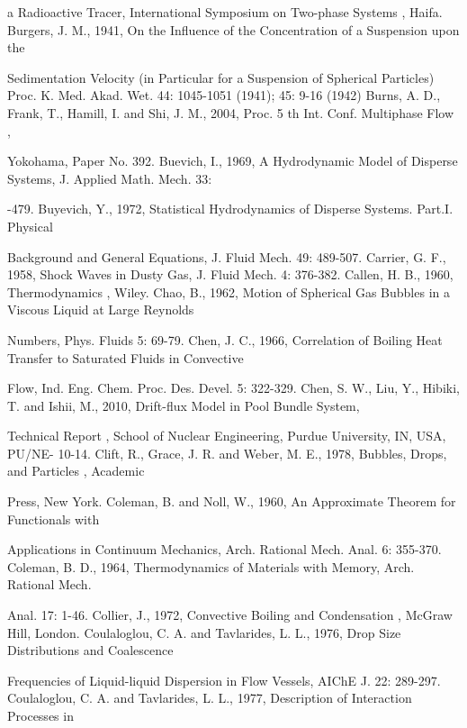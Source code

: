 \documentclass[11pt,a4paper,openany,fontset=none]{ctexbook}
\begin{document}
{\small\raggedright\noindent a Radioactive Tracer, International Symposium on Two-phase Systems , Haifa. Burgers, J. M., 1941, On the Influence of the Concentration of a Suspension upon the\par}
{\small\raggedright\noindent Sedimentation Velocity (in Particular for a Suspension of Spherical Particles) Proc. K. Med. Akad. Wet. 44: 1045-1051 (1941); 45: 9-16 (1942) Burns, A. D., Frank, T., Hamill, I. and Shi, J. M., 2004, Proc. 5 th Int. Conf. Multiphase Flow ,\par}
{\small\raggedright\noindent Yokohama, Paper No. 392. Buevich, I., 1969, A Hydrodynamic Model of Disperse Systems, J. Applied Math. Mech. 33:\par}
{\small\raggedright{}-479. Buyevich, Y., 1972, Statistical Hydrodynamics of Disperse Systems. Part.I. Physical\par}
{\small\raggedright\noindent Background and General Equations, J. Fluid Mech. 49: 489-507. Carrier, G. F., 1958, Shock Waves in Dusty Gas, J. Fluid Mech. 4: 376-382. Callen, H. B., 1960, Thermodynamics , Wiley. Chao, B., 1962, Motion of Spherical Gas Bubbles in a Viscous Liquid at Large Reynolds\par}
{\small\raggedright\noindent Numbers, Phys. Fluids 5: 69-79. Chen, J. C., 1966, Correlation of Boiling Heat Transfer to Saturated Fluids in Convective\par}
{\small\raggedright\noindent Flow, Ind. Eng. Chem. Proc. Des. Devel. 5: 322-329. Chen, S. W., Liu, Y., Hibiki, T. and Ishii, M., 2010, Drift-flux Model in Pool Bundle System,\par}
{\small\raggedright\noindent Technical Report , School of Nuclear Engineering, Purdue University, IN, USA, PU/NE- 10-14. Clift, R., Grace, J. R. and Weber, M. E., 1978, Bubbles, Drops, and Particles , Academic\par}
{\small\raggedright\noindent Press, New York. Coleman, B. and Noll, W., 1960, An Approximate Theorem for Functionals with\par}
{\small\raggedright\noindent Applications in Continuum Mechanics, Arch. Rational Mech. Anal. 6: 355-370. Coleman, B. D., 1964, Thermodynamics of Materials with Memory, Arch. Rational Mech.\par}
{\small\raggedright\noindent Anal. 17: 1-46. Collier, J., 1972, Convective Boiling and Condensation , McGraw Hill, London. Coulaloglou, C. A. and Tavlarides, L. L., 1976, Drop Size Distributions and Coalescence\par}
{\small\raggedright\noindent Frequencies of Liquid-liquid Dispersion in Flow Vessels, AIChE J. 22: 289-297. Coulaloglou, C. A. and Tavlarides, L. L., 1977, Description of Interaction Processes in\par}
\end{document}
